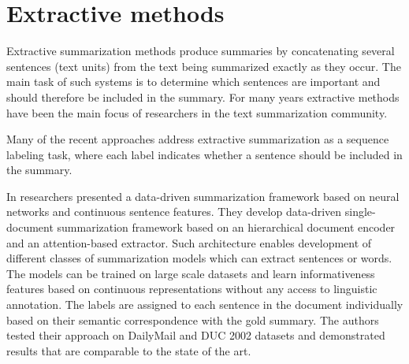 \documentclass[11pt,a4paper,onecolumn]{article}
\begin{document}
\section{Extractive methods}
Extractive summarization methods produce summaries by concatenating several sentences (text units) from the text being summarized exactly as they occur.
The main task of such systems is to determine which sentences are important and should therefore be included in the summary.
For many years extractive methods have been the main focus of researchers in the text summarization community.

Many of the recent approaches address extractive summarization as a sequence labeling task, where each label indicates whether a sentence should be included in the summary.

In \cite{cheng2016neural} researchers presented a data-driven summarization framework based on neural networks and continuous sentence features.
They develop data-driven single-document summarization framework based on an hierarchical document encoder and an attention-based extractor.
Such architecture enables development of different classes of summarization models which can extract sentences or words.
The models can be trained on large scale datasets and learn informativeness features based on continuous representations without any access to linguistic annotation.
The labels are assigned to each sentence in the document individually based on their semantic correspondence with the gold summary.
The authors tested their approach on DailyMail and DUC 2002 datasets and demonstrated results that are comparable to the state of the art.
\end{document}

